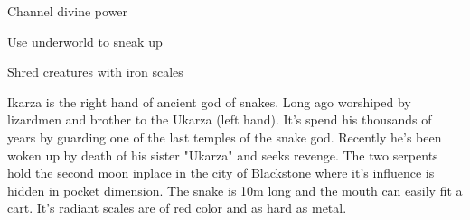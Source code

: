 {
\item Channel divine power
\item Use underworld to sneak up
\item Shred creatures with iron scales
}
{
	Ikarza is the right hand of ancient god of snakes. Long ago worshiped by lizardmen and brother to the Ukarza (left hand). It's spend his thousands of years by guarding one of the last temples of the snake god. Recently he's been woken up by death of his sister "Ukarza" and seeks revenge. The two serpents hold the second moon inplace in the city of Blackstone where it's influence is hidden in pocket dimension. The snake is 10m long and the mouth can easily fit a cart. It's radiant scales are of red color and as hard as metal. 
}
